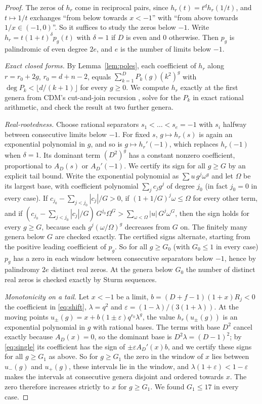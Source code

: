 \documentclass[11pt,a4paper]{article}
\theoremstyle{definition}\newtheorem{definition}[theorem]{Definition}
\theoremstyle{remark}\newtheorem{remark}[theorem]{Remark}\newtheorem{example}[theorem]{Example}
\numberwithin{equation}{section}
\begin{document}
\begin{proof}
The zeros of $h_r$ come in reciprocal pairs, since $h_r(t)=t^dh_r(1/t)$, and $t\mapsto1/t$ exchanges ``from below towards $x<-1$'' with ``from above towards $1/x\in(-1,0)$''. So it suffices to study the zeros below $-1$. Write $h_r=t(1+t)^{\delta}p_g(t)$ with $\delta=1$ if $D$ is even and $0$ otherwise. Then $p_g$ is palindromic of even degree $2e$, and $e$ is the number of limits below $-1$.

\emph{Exact closed forms.} By Lemma~\ref{lem:poles}, each coefficient of $h_r$ along $r=r_0+2g$, $r_0=d+n-2$, equals $\sum_{k=1}^{D}P_k(g)(k^2)^g$ with $\deg P_k<\lfloor d/(k+1)\rfloor$ for every $g\ge0$. We compute $h_r$ exactly at the first genera from CDM's cut-and-join recursion \cite[Theorem~3.7]{cdm}, solve for the $P_k$ in exact rational arithmetic, and check the result at two further genera.

\emph{Real-rootedness.} Choose rational separators $s_1<\dots<s_{e}=-1$ with $s_i$ halfway between consecutive limits below $-1$. For fixed $s$, $g\mapsto h_r(s)$ is again an exponential polynomial in $g$, and so is $g\mapsto h_r'(-1)$, which replaces $h_r(-1)$ when $\delta=1$. Its dominant term $(D^2)^g$ has a constant nonzero coefficient, proportional to $A_D(s)$ or $A_D'(-1)$. We certify its sign for all $g\ge G$ by an explicit tail bound. Write the exponential polynomial as $\sum u\,g^j\omega^g$ and let $\Omega$ be its largest base, with coefficient polynomial $\sum_jc_jg^j$ of degree $j_0$ (in fact $j_0=0$ in every case). If $c_{j_0}-\sum_{j<j_0}|c_j|/G>0$, if $(1+1/G)^j\omega\le\Omega$ for every other term, and if $(c_{j_0}-\sum_{j<j_0}|c_j|/G)\,G^{j_0}\Omega^G>\sum_{\omega<\Omega}|u|\,G^{j}\omega^{G}$, then the sign holds for every $g\ge G$, because each $g^j(\omega/\Omega)^g$ decreases from $G$ on. The finitely many genera below $G$ are checked exactly. The certified signs alternate, starting from the positive leading coefficient of $p_g$. So for all $g\ge G_0$ (with $G_0\le1$ in every case) $p_g$ has a zero in each window between consecutive separators below $-1$, hence by palindromy $2e$ distinct real zeros. At the genera below $G_0$ the number of distinct real zeros is checked exactly by Sturm sequences.

\emph{Monotonicity on a tail.} Let $x<-1$ be a limit, $b=(D+f-1)(1+x)R_j<0$ the coefficient in \eqref{eq:shift}, $\lambda=q^2$ and $\varepsilon=(1-\lambda)/(3(1+\lambda))$. At the moving points $u_\pm(g)=x+b(1\pm\varepsilon)q^{r_0}\lambda^g$, the value $h_r(u_\pm(g))$ is an exponential polynomial in $g$ with rational bases. The terms with base $D^2$ cancel exactly because $A_D(x)=0$, so the dominant base is $D^2\lambda=(D-1)^2$; by \eqref{eq:single} its coefficient has the sign of $\pm\varepsilon A_D'(x)b$, and we certify these signs for all $g\ge G_1$ as above. So for $g\ge G_1$ the zero in the window of $x$ lies between $u_-(g)$ and $u_+(g)$, these intervals lie in the window, and $\lambda(1+\varepsilon)<1-\varepsilon$ makes the intervals at consecutive genera disjoint and ordered towards $x$. The zero therefore increases strictly to $x$ for $g\ge G_1$. We found $G_1\le17$ in every case.


\end{proof}
\end{document}
